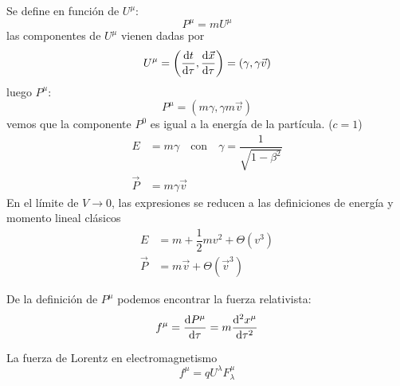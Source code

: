 \documentclass[../main]{subfiles}
\begin{document}
 Se define en función de $U^{\mu}$:
\begin{equation}
    P^{\mu}=mU^{\mu}
\end{equation}
las componentes de $U^{\mu}$ vienen dadas por 
\begin{equation}
    U^{\mu}=\left(\dv{t}{\tau}, \dv{\vec{x}}{\tau}\right)=(\gamma, \gamma \vec{v})
\end{equation}
luego $P^{\mu}$:
\begin{equation}
    P^{\mu}=(m\gamma, \gamma m\vec{v})
\end{equation}
vemos que la componente $P^0$ es igual a la energía de la partícula. ($c=1$)
\begin{equation}
    \begin{split}
        E&=m\gamma \quad \text{con} \quad \gamma=\dfrac{1}{\sqrt{1-\beta^2}} \\
        \vec{P}&=m\gamma \vec{v}
    \end{split}
\end{equation}
En el límite de $V\rightarrow 0$, las expresiones se reducen a las definiciones de energía y momento lineal clásicos 
\begin{equation}
    \begin{split}
        E&=m+\dfrac{1}{2}mv^2+\Theta(v^3) \\
        \vec{P}&=m\vec{v}+\Theta(\vec{v}^3)
    \end{split}
\end{equation}

 De la definición de $P^{\mu}$ podemos encontrar la fuerza relativista:
\begin{equation}
    f^{\mu}=\dv{P^{\mu}}{\tau}=m\dv[2]{x^{\mu}}{\tau}
\end{equation}

\ejemplo{} La fuerza de Lorentz en electromagnetismo
\begin{equation}
    f^{\mu}=qU^{\lambda} F^{\mu}_{\lambda}
\end{equation}
\end{document}
